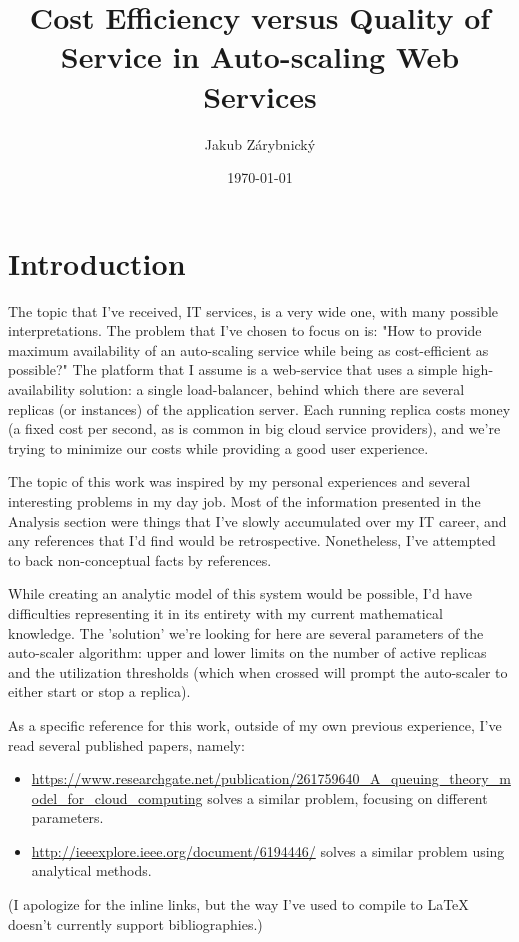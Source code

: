 \documentclass{scrartcl}
\author{Jakub Zárybnický}
\date{\today}
\title{Cost Efficiency versus Quality of Service in Auto-scaling Web Services}
\begin{document}
\maketitle

\section{Introduction}
\label{sec-1}
The topic that I've received, IT services, is a very wide one, with many
possible interpretations. The problem that I've chosen to focus on is: "How
to provide maximum availability of an auto-scaling service while being as
cost-efficient as possible?" The platform that I assume is a web-service that
uses a simple high-availability solution: a single load-balancer, behind which
there are several replicas (or instances) of the application server. Each
running replica costs money (a fixed cost per second, as is common in big cloud
service providers), and we're trying to minimize our costs while providing a
good user experience.

The topic of this work was inspired by my personal experiences and several
interesting problems in my day job. Most of the information presented in the
Analysis section were things that I've slowly accumulated over my IT career, and
any references that I'd find would be retrospective. Nonetheless, I've attempted
to back non-conceptual facts by references.

While creating an analytic model of this system would be possible, I'd have
difficulties representing it in its entirety with my current mathematical
knowledge. The 'solution' we're looking for here are several parameters of the
auto-scaler algorithm: upper and lower limits on the number of active replicas
and the utilization thresholds (which when crossed will prompt the auto-scaler
to either start or stop a replica).

As a specific reference for this work, outside of my own previous experience, I've
read several published papers, namely:
\begin{itemize}
\item \url{https://www.researchgate.net/publication/261759640_A_queuing_theory_model_for_cloud_computing}
  solves a similar problem, focusing on different parameters.
\item \url{http://ieeexplore.ieee.org/document/6194446/} solves a similar problem using
analytical methods.
\end{itemize}

(I apologize for the inline links, but the way I've used to compile to \LaTeX{}
doesn't currently support bibliographies.)
\end{document}
